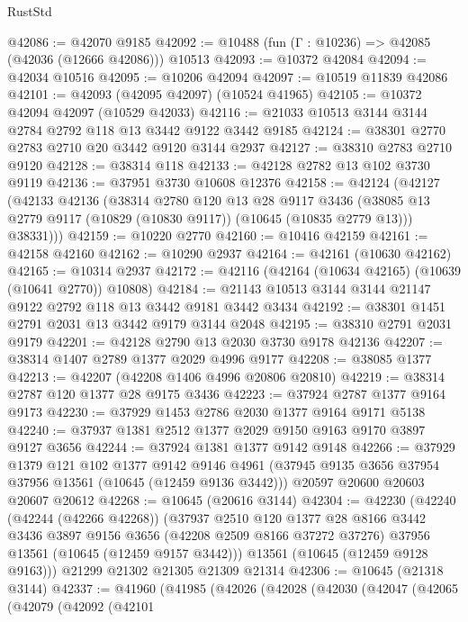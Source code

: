 \begin{lexlean}{RustStd}
\begin{coremodule}
@42086 := @42070 @9185
@42092 := @10488 (fun (Γ : @10236) => @42085 (@42036 (@12666 @42086))) @10513
@42093 := @10372 @42084
@42094 := @42034 @10516
@42095 := @10206 @42094
@42097 := @10519 @11839 @42086
@42101 := @42093 (@42095 @42097) (@10524 @41965)
@42105 := @10372 @42094 @42097 (@10529 @42033)
@42116 := @21033 @10513 @3144 @3144 @2784 @2792 @118 @13 @3442 @9122 @3442 @9185
@42124 := @38301 @2770 @2783 @2710 @20 @3442 @9120 @3144 @2937
@42127 := @38310 @2783 @2710 @9120
@42128 := @38314 @118
@42133 := @42128 @2782 @13 @102 @3730 @9119
@42136 := @37951 @3730 @10608 @12376
@42158 := @42124
    (@42127
      (@42133
        @42136
        (@38314
          @2780
          @120
          @13
          @28
          @9117
          @3436
          (@38085 @13 @2779 @9117 (@10829 (@10830 @9117)) (@10645 (@10835 @2779 @13)))
          @38331)))
@42159 := @10220 @2770
@42160 := @10416 @42159
@42161 := @42158 @42160
@42162 := @10290 @2937
@42164 := @42161 (@10630 @42162)
@42165 := @10314 @2937
@42172 := @42116 (@42164 (@10634 @42165) (@10639 (@10641 @2770)) @10808)
@42184 := @21143 @10513 @3144 @3144 @21147 @9122 @2792 @118 @13 @3442 @9181 @3442 @3434
@42192 := @38301 @1451 @2791 @2031 @13 @3442 @9179 @3144 @2048
@42195 := @38310 @2791 @2031 @9179
@42201 := @42128 @2790 @13 @2030 @3730 @9178 @42136
@42207 := @38314 @1407 @2789 @1377 @2029 @4996 @9177
@42208 := @38085 @1377
@42213 := @42207 (@42208 @1406 @4996 @20806 @20810)
@42219 := @38314 @2787 @120 @1377 @28 @9175 @3436
@42223 := @37924 @2787 @1377 @9164 @9173
@42230 := @37929 @1453 @2786 @2030 @1377 @9164 @9171 @5138
@42240 := @37937 @1381 @2512 @1377 @2029 @9150 @9163 @9170 @3897 @9127 @3656
@42244 := @37924 @1381 @1377 @9142 @9148
@42266 := @37929
    @1379
    @121
    @102
    @1377
    @9142
    @9146
    @4961
    (@37945 @9135 @3656 @37954 @37956 @13561 (@10645 (@12459 @9136 @3442)))
    @20597
    @20600
    @20603
    @20607
    @20612
@42268 := @10645 (@20616 @3144)
@42304 := @42230
    (@42240
      (@42244 (@42266 @42268))
      (@37937
        @2510
        @120
        @1377
        @28
        @8166
        @3442
        @3436
        @3897
        @9156
        @3656
        (@42208 @2509 @8166 @37272 @37276)
        @37956
        @13561
        (@10645 (@12459 @9157 @3442)))
      @13561
      (@10645 (@12459 @9128 @9163)))
    @21299
    @21302
    @21305
    @21309
    @21314
@42306 := @10645 (@21318 @3144)
@42337 := @41960
    (@41985
      (@42026
        (@42028
          (@42030
            (@42047
              (@42065
                (@42079
                  (@42092
                    (@42101

\end{coremodule}
\end{lexlean}
